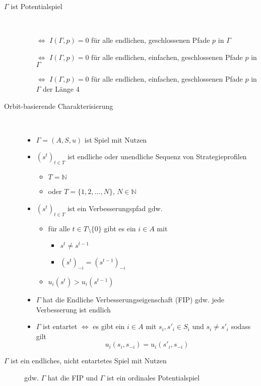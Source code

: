 	\begin{description}
		\item[$\Gamma$ ist Potentialspiel] \ \\\vspace*{-\baselineskip}
			\begin{itemize}
				\item[$\Leftrightarrow$] $I(\Gamma,p)=0$ für alle endlichen, geschlossenen Pfade $p$ in $\Gamma$
				\item[$\Leftrightarrow$] $I(\Gamma,p)=0$ für alle endlichen, einfachen, geschlossenen Pfade $p$ in $\Gamma$
				\item[$\Leftrightarrow$] $I(\Gamma,p)=0$ für alle endlichen, einfachen, geschlossenen Pfade $p$ in $\Gamma$ der Länge $4$
			\end{itemize}
		\item[Orbit-basierende Charakterisierung]\ \\\vspace*{-\baselineskip}
			\begin{itemize}
				\item $\Gamma=(A,S,u)$ ist Spiel mit Nutzen
				\item $(s^t)_{t\in T}$ ist endliche oder unendliche Sequenz von Strategieprofilen
					\begin{itemize}
						\item $T=\mathbb{N}$
						\item oder $T=\{1,2,\dots,N\}$, $N\in \mathbb{N}$
					\end{itemize}
				\item $(s^t)_{t\in T}$ ist ein Verbesserungspfad gdw. 
					\begin{itemize}
						\item für alle $t\in T\setminus\{0\}$ gibt es ein $i\in A$ mit
							\begin{itemize}
								\item $s^t\neq s^{t-1}$
								\item $(s^t)_{-i}=(s^{t-1})_{-i}$
							\end{itemize}
						\item $u_i(s^t)>u_i(s^{t-1})$
					\end{itemize}
				\item $\Gamma$ hat die Endliche Verbesserungseigenschaft (FIP) gdw. jede Verbesserung ist endlich
				\item $\Gamma$ ist entartet $\Leftrightarrow$ es gibt ein $i\in A$ mit $s_i,s'_i\in S_i$ und $s_i\neq s'_i$ sodass gilt
					\[u_i(s_i,s_{-i})=u_i(s'_i,s_{-i})\]
			\end{itemize}
		\item[$\Gamma$ ist ein endliches, nicht entartetes Spiel mit Nutzen] gdw. $\Gamma$ hat die FIP und $\Gamma$ ist ein ordinales Potentialspiel
	\end{description}
